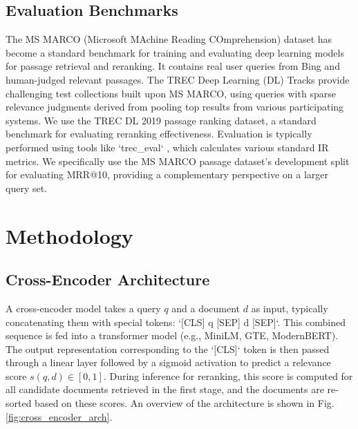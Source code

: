 \documentclass[conference]{IEEEtran}
\begin{document}
\subsection{Evaluation Benchmarks}
The MS MARCO (Microsoft MAchine Reading COmprehension) dataset \cite{DBLP:journals/corr/NguyenRSGTMD16, DBLP:journals/corr/NguyenRSGTMD16} has become a standard benchmark for training and evaluating deep learning models for passage retrieval and reranking. It contains real user queries from Bing and human-judged relevant passages. The TREC Deep Learning (DL) Tracks \cite{craswell2020overview, craswell2021overview} provide challenging test collections built upon MS MARCO, using queries with sparse relevance judgments derived from pooling top results from various participating systems. We use the TREC DL 2019 passage ranking dataset, a standard benchmark for evaluating reranking effectiveness. Evaluation is typically performed using tools like `trec\_eval` \cite{trec_eval_github}, which calculates various standard IR metrics. We specifically use the MS MARCO passage dataset's development split for evaluating MRR@10, providing a complementary perspective on a larger query set.

\section{Methodology}
\label{sec:methodology}

\subsection{Cross-Encoder Architecture}
A cross-encoder model takes a query $q$ and a document $d$ as input, typically concatenating them with special tokens: `[CLS] q [SEP] d [SEP]`. This combined sequence is fed into a transformer model (e.g., MiniLM, GTE, ModernBERT). The output representation corresponding to the `[CLS]` token is then passed through a linear layer followed by a sigmoid activation to predict a relevance score $s(q, d) \in [0, 1]$. During inference for reranking, this score is computed for all candidate documents retrieved in the first stage, and the documents are re-sorted based on these scores. An overview of the architecture is shown in Fig. \ref{fig:cross_encoder_arch}.
\end{document}
